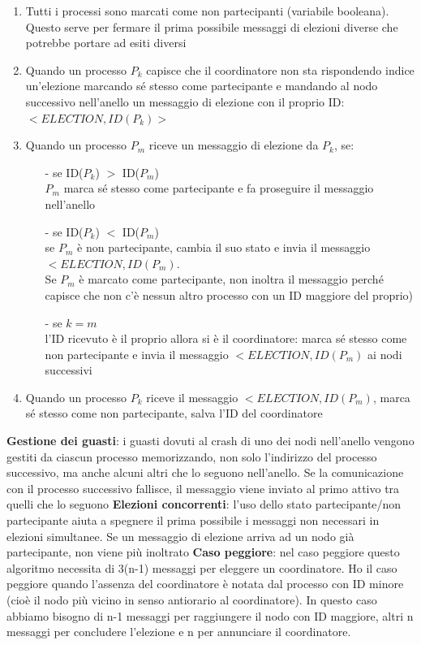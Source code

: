 \documentclass[12pt,italian]{report}
\begin{document}
\begin{enumerate}
    \item Tutti i processi sono marcati come non partecipanti (variabile booleana). Questo serve per fermare il prima possibile messaggi di elezioni diverse che potrebbe portare ad esiti diversi
    \item Quando un processo $P_k$ capisce che il coordinatore non sta rispondendo indice un'elezione marcando sé stesso come partecipante e mandando al nodo successivo nell'anello un messaggio di elezione con il proprio ID: \\ $<ELECTION, ID(P_k)>$
    \item Quando un processo $P_m$ riceve un messaggio di elezione da $P_k$, se:
    \begin{itemize}
        \item [-] se ID($P_k$) $>$ ID($P_m$) \\ $P_m$ marca sé stesso come partecipante e fa proseguire il messaggio nell'anello 
        \item [-] se ID($P_k$) $<$ ID($P_m$) \\ se $P_m$ è non partecipante, cambia il suo stato e invia il messaggio \\ $<ELECTION, ID(P_m)$. \\ Se $P_m$ è marcato come partecipante, non inoltra il messaggio perché capisce che non c'è nessun altro processo con un ID maggiore del proprio)
        \item [-] se $k = m$ \\ l'ID ricevuto è il proprio allora si è il coordinatore: marca sé stesso come non partecipante e invia il messaggio $<ELECTION, ID(P_m)$ ai nodi successivi
    \end{itemize}
    \item Quando un processo $P_k$ riceve il messaggio $<ELECTION, ID(P_m)$, marca sé stesso come non partecipante, salva l'ID del coordinatore 
\end{enumerate}
\noindent \textbf{Gestione dei guasti}: i guasti dovuti al crash di uno dei nodi nell'anello vengono gestiti da ciascun processo memorizzando, non solo l'indirizzo del processo successivo, ma anche alcuni altri che lo seguono nell'anello. Se la comunicazione con il processo successivo fallisce, il messaggio viene inviato al primo attivo tra quelli che lo seguono
\bigbreak
\noindent \textbf{Elezioni concorrenti}: l'uso dello stato partecipante/non partecipante aiuta a spegnere il prima possibile i messaggi non necessari in elezioni simultanee. Se un messaggio di elezione arriva ad un nodo già partecipante, non viene più inoltrato
\bigbreak
\noindent \textbf{Caso peggiore}: nel caso peggiore questo algoritmo necessita di 3(n-1) messaggi per eleggere un coordinatore. Ho il caso peggiore quando l'assenza del coordinatore è notata dal processo con ID minore (cioè il nodo più vicino in senso antiorario al coordinatore). In questo caso abbiamo bisogno di n-1 messaggi per raggiungere il nodo con ID maggiore, altri n messaggi per concludere l'elezione e n per annunciare il coordinatore. 
\end{document}
